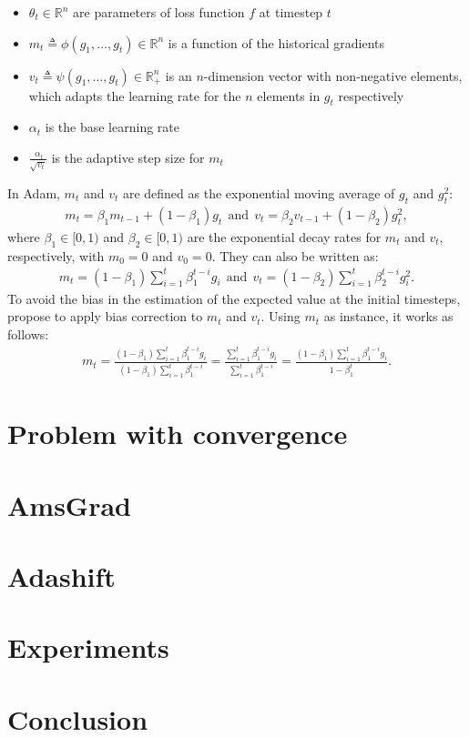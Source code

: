 \documentclass[12pt,a4paper,titlepage,fleqn]{article}
\begin{document}
\begin{itemize}
\item  $\theta_t\!\in\!\mathbb R^n$ are parameters of loss function $f$  at timestep $t$
\item $m_t\triangleq\phi(g_1,\dots,g_t) \in \mathbb R^n$ is a function of the historical gradients
\item $v_t\triangleq\psi(g_1,\dots,g_t) \in \mathbb R^{n}_{+}$ is an $n$-dimension vector with non-negative elements, which adapts the learning rate for the $n$ elements in $g_t$ respectively
\item $\alpha_t$ is the base learning rate
\item $\frac{~\alpha_t}{\sqrt{v_t}}$ is the adaptive step size for $m_t$
\end{itemize}
In Adam, $m_t$ and $v_t$ are defined as the exponential moving average of $g_t$ and $g^2_t$: %
\begin{equation}\label{adam_psi}
\begin{aligned}
m_t = \beta_1 m_{t-1} +(1-\beta_1)g_t ~~\mbox{and}~~
v_t = \beta_2 v_{t-1} + (1-\beta_2) g_t^2,
\end{aligned}
\end{equation}
where $\beta_1 \in [0, 1)$ and $\beta_2 \in [0, 1)$ are the exponential decay rates for $m_t$ and $v_t$, %
respectively, with $m_0=0$ and $v_0=0$. 
They can also be written as:
\begin{equation}\label{adam_psi2}
\begin{aligned}
m_t = (1-\beta_1)\sum_{i=1}^{t}\beta_1^{t-i}g_i  ~~\mbox{and}~~
v_t = (1-\beta_2)\sum_{i=1}^{t}\beta_2^{t-i}g_i^2.  
\end{aligned}
\end{equation}
To avoid the bias in the estimation of the expected value at the initial timesteps, propose to apply bias correction to $m_t$ and $v_t$. Using $m_t$ as instance, it works as follows:
\begin{equation}\label{adam_bias}
\begin{aligned}
m_t = \frac{(1-\beta_1)\sum_{i=1}^{t}\beta_1^{t-i}g_i}{(1-\beta_1)\sum_{i=1}^{t}\beta_1^{t-i}} 
= \frac{\sum_{i=1}^{t}\beta_1^{t-i}g_i}{\sum_{i=1}^{t}\beta_1^{t-i}}  = \frac{(1-\beta_1)\sum_{i=1}^{t}\beta_1^{t-i}g_i}{1-\beta_1^t}.  
\end{aligned}
\end{equation}


\section{Problem with convergence}

\section{AmsGrad}

\section{Adashift }

\section{Experiments}

\section{Conclusion }

\newpage
\printbibliography
\end{document}
